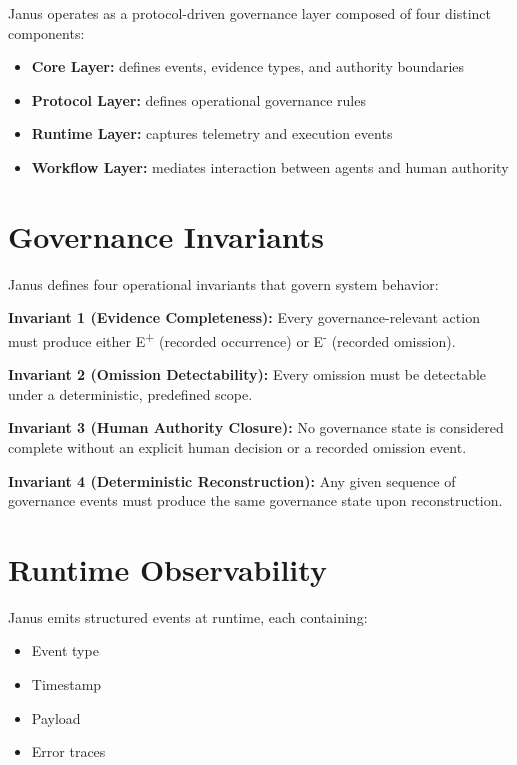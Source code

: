 \documentclass[conference]{IEEEtran}
\begin{document}
Janus operates as a protocol-driven governance layer composed of four distinct
components:

\begin{itemize}
    \item \textbf{Core Layer:} defines events, evidence types, and authority boundaries
    \item \textbf{Protocol Layer:} defines operational governance rules
    \item \textbf{Runtime Layer:} captures telemetry and execution events
    \item \textbf{Workflow Layer:} mediates interaction between agents and human authority
\end{itemize}

\section{Governance Invariants}

Janus defines four operational invariants that govern system behavior:

\medskip
\noindent\textbf{Invariant 1 (Evidence Completeness):}
Every governance-relevant action must produce either E\textsuperscript{+}
(recorded occurrence) or E\textsuperscript{-} (recorded omission).

\medskip
\noindent\textbf{Invariant 2 (Omission Detectability):}
Every omission must be detectable under a deterministic, predefined scope.

\medskip
\noindent\textbf{Invariant 3 (Human Authority Closure):}
No governance state is considered complete without an explicit human decision
or a recorded omission event.

\medskip
\noindent\textbf{Invariant 4 (Deterministic Reconstruction):}
Any given sequence of governance events must produce the same governance state
upon reconstruction.

\section{Runtime Observability}

Janus emits structured events at runtime, each containing:
\begin{itemize}
    \item Event type
    \item Timestamp
    \item Payload
    \item Error traces
\end{itemize}
\end{document}
